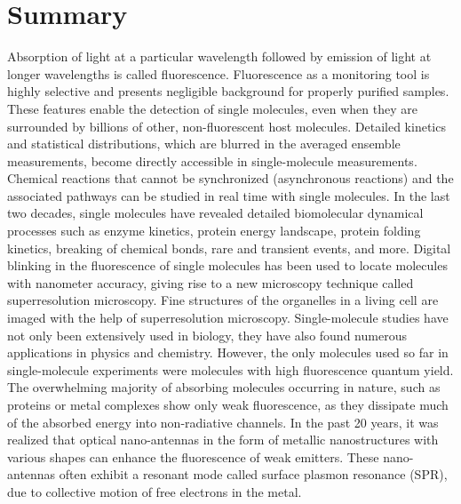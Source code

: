 \chapter*{Summary}
\label{ch:Summary}

Absorption of light at a particular wavelength followed by emission of light at longer wavelengths is called fluorescence.
Fluorescence as a monitoring tool is highly selective and presents negligible background for properly purified samples. These features enable the detection of single molecules, even when they are surrounded by billions of other, non-fluorescent host molecules.
Detailed kinetics and statistical distributions, which are blurred in the averaged ensemble measurements, become directly accessible in single-molecule measurements.
Chemical reactions that cannot be synchronized (asynchronous reactions) and the associated pathways can be studied in real time with single molecules.
In the last two decades, single molecules have revealed detailed biomolecular dynamical processes such as enzyme kinetics, protein energy landscape, protein folding kinetics, breaking of chemical bonds, rare and transient events, and more.
Digital blinking in the fluorescence of single molecules has been used to locate molecules with nanometer accuracy, giving rise to a new microscopy technique called superresolution microscopy.
Fine structures of the organelles in a living cell are imaged with the help of superresolution microscopy.
Single-molecule studies have not only been extensively used in biology, they have also found numerous applications in physics and chemistry.
However, the only molecules used so far in single-molecule experiments were molecules with high fluorescence quantum yield.
The overwhelming majority of absorbing molecules occurring in nature, such as proteins or metal complexes show only weak fluorescence, as they dissipate much of the absorbed energy into non-radiative channels.
In the past 20 years, it was realized that optical nano-antennas in the form of metallic nanostructures with various shapes can enhance the fluorescence of weak emitters.
These nano-antennas often exhibit a resonant mode called surface plasmon resonance (SPR), due to collective motion of free electrons in the metal.

